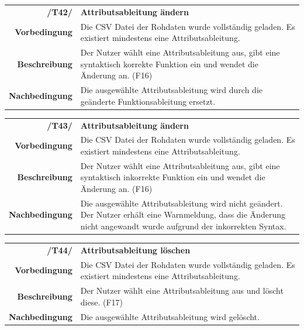 \documentclass{article}
\begin{document}
\begin{table}[H]
\begin{tabularx}{\textwidth}{rX}
\textbf{/T42/}         & \textbf{Attributsableitung ändern} \\
\textbf{Vorbedingung}  & Die CSV Datei der Rohdaten wurde vollständig geladen. Es existiert mindestens eine Attributsableitung.  \\
\textbf{Beschreibung}  & Der Nutzer wählt eine Attributsableitung aus, gibt eine syntaktisch korrekte Funktion ein und wendet die Änderung an. (F16) \\
\textbf{Nachbedingung} & Die ausgewählte Attributsableitung wird durch die geänderte Funktionsableitung ersetzt.
\end{tabularx}
\end{table}

\begin{table}[H]
\begin{tabularx}{\textwidth}{rX}
\textbf{/T43/}         & \textbf{Attributsableitung ändern} \\
\textbf{Vorbedingung}  & Die CSV Datei der Rohdaten wurde vollständig geladen. Es existiert mindestens eine Attributsableitung.   \\
\textbf{Beschreibung}  & Der Nutzer wählt eine Attributsableitung aus, gibt eine syntaktisch inkorrekte Funktion ein und wendet die Änderung an. (F16) \\
\textbf{Nachbedingung} & Die ausgewählte Attributsableitung wird nicht geändert. Der Nutzer erhält eine Warnmeldung, dass die Änderung nicht angewandt wurde aufgrund der inkorrekten Syntax.
\end{tabularx}
\end{table}

\begin{table}[H]
\begin{tabularx}{\textwidth}{rX}
\textbf{/T44/}         & \textbf{Attributsableitung löschen} \\
\textbf{Vorbedingung}  & Die CSV Datei der Rohdaten wurde vollständig geladen. Es existiert mindestens eine Attributsableitung.  \\
\textbf{Beschreibung}  & Der Nutzer wählt eine Attributsableitung aus und löscht diese. (F17) \\
\textbf{Nachbedingung} & Die ausgewählte Attributsableitung wird gelöscht.
\end{tabularx}
\end{table}
\end{document}
